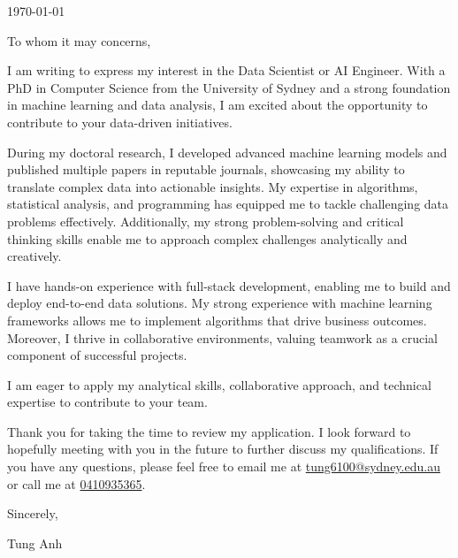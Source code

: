 \documentclass{ExpressiveCoverLetter}
\begin{document}
\coverletterheader[
    firstname=Tung,
    middleinitial=Anh,
    lastname=Nguyen,
    email=tung6100@uni.sydney.edu.au,
    phone=0410935365,
    city=Sydney,
    state=NSW,
]

\vspace{0.25in}
\today
\vspace{0.15in}


To whom it may concerns,

I am writing to express my interest in the Data Scientist or AI Engineer. With a PhD in Computer Science from the University of Sydney and a strong foundation in machine learning and data analysis, I am excited about the opportunity to contribute to your data-driven initiatives.

During my doctoral research, I developed advanced machine learning models and published multiple papers in reputable journals, showcasing my ability to translate complex data into actionable insights. My expertise in algorithms, statistical analysis, and programming has equipped me to tackle challenging data problems effectively. Additionally, my strong problem-solving and critical thinking skills enable me to approach complex challenges analytically and creatively.

I have hands-on experience with full-stack development, enabling me to build and deploy end-to-end data solutions. My strong experience with machine learning frameworks allows me to implement algorithms that drive business outcomes. Moreover, I thrive in collaborative environments, valuing teamwork as a crucial component of successful projects.

I am eager to apply my analytical skills, collaborative approach, and technical expertise to contribute to your team.

Thank you for taking the time to review my application. I look forward
to hopefully meeting with you in the future to further discuss my
qualifications. If you have any questions, please feel free to
email me at \href{mailto:tung6100@sydney.edu.au}{tung6100@sydney.edu.au} or
call me at \href{tel:0410935365}{0410935365}.

Sincerely,

\vspace{.15in}

Tung Anh
\end{document}
